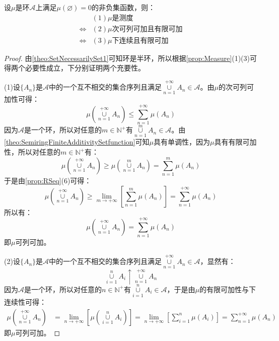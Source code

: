 \begin{theorem}
	设$\mu$是环$\mathscr{A}$上满足$\mu(\varnothing)=0$的非负集函数，则：
	\begin{align*}
		&(1)\mu\text{是测度} \\
		\Leftrightarrow&(2)\mu\text{次可列可加且有限可加} \\
		\Leftrightarrow&(3)\mu\text{下连续且有限可加}
	\end{align*}
\end{theorem}
\begin{proof}
	由\cref{theo:SetNecessarilySet1}可知环是半环，所以根据\cref{prop:Measure}(1)(3)可得两个必要性成立，下分别证明两个充要性。\par
	(1)设$\{A_n\}$是$\mathscr{A}$中的一个互不相交的集合序列且满足$\underset{n=1}{\overset{+\infty}{\cup}}A_n\in\mathscr{A}$。由$\mu$的次可列可加性可得：
	\begin{equation*}
		\mu\left(\underset{n=1}{\overset{+\infty}{\cup}}A_n\right)\leqslant
		\sum_{n=1}^{+\infty}\mu(A_n)
	\end{equation*}
	因为$\mathscr{A}$是一个环，所以对任意的$m\in\mathbb{N}^+$有$\underset{n=1}{\overset{m}{\cup}}A_n\in\mathscr{A}$。由\cref{theo:SemiringFiniteAdditivitySetfunction}可知$\mu$具有单调性，因为$\mu$具有有限可加性，所以对任意的$m\in\mathbb{N}^+$有：
	\begin{equation*}
		\mu\left(\underset{n=1}{\overset{+\infty}{\cup}}A_n\right)\geqslant\mu\left(\underset{n=1}{\overset{m}{\cup}}A_n\right)=\sum_{n=1}^{m}\mu(A_n)
	\end{equation*}
	于是由\cref{prop:RSeq}(6)可得：
	\begin{equation*}
		\mu\left(\underset{n=1}{\overset{+\infty}{\cup}}A_n\right)\geqslant\lim_{m\to+\infty}\left[\sum_{n=1}^{m}\mu(A_n)\right]=
		\sum_{n=1}^{+\infty}\mu(A_n)
	\end{equation*}
	所以有：
	\begin{equation*}
		\mu\left(\underset{n=1}{\overset{+\infty}{\cup}}A_n\right)=\sum_{n=1}^{+\infty}\mu(A_n)
	\end{equation*}
	即$\mu$可列可加。\par
	(2)设$\{A_n\}$是$\mathscr{A}$中的一个互不相交的集合序列且满足$\underset{n=1}{\overset{+\infty}{\cup}}A_n\in\mathscr{A}$，显然有：
	\begin{equation*}
		\underset{i=1}{\overset{n}{\cup}}A_i\uparrow\underset{n=1}{\overset{+\infty}{\cup}}A_n
	\end{equation*}
	因为$\mathscr{A}$是一个环，所以对任意的$n\in\mathbb{N}^+$有$\underset{i=1}{\overset{n}{\cup}}A_i\in\mathscr{A}$，于是由$\mu$的有限可加性与下连续性可得：
	\begin{align*}
		\mu\left(\underset{n=1}{\overset{+\infty}{\cup}}A_n\right)
		&=\lim_{n\to+\infty}\left[\mu\left(\underset{i=1}{\overset{n}{\cup}}A_i\right)\right] =\lim_{n\to+\infty}\left[\sum_{i=1}^{n}\mu(A_i)\right]=\sum_{n=1}^{+\infty}\mu(A_n)
	\end{align*}
	即$\mu$可列可加。
\end{proof}

